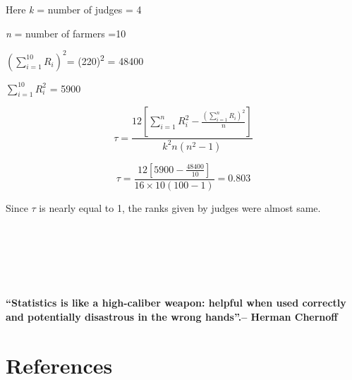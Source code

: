 \documentclass[
]{book}
\begin{document}
Here \emph{k} = number of judges = 4

\emph{n} = number of farmers =10

\(\left( \sum_{i = 1}^{10}R_{i} \right)^{2}\)= (220)\textsuperscript{2} = 48400

\(\sum_{i = 1}^{10}R_{i}^{2}\) = 5900

\[\tau = \frac{12\left\lbrack \sum_{i = 1}^{n}{R_{i}^{2} - \frac{\left( \sum_{i = 1}^{n}R_{i} \right)^{2}}{n}} \right\rbrack}{k^{2}n\left( n^{2} - 1 \right)}\]

\[\tau = \frac{12\left\lbrack 5900 - \frac{48400}{10} \right\rbrack}{16 \times 10\left( 100 - 1 \right)} = 0.803\]

Since \(\tau\) is nearly equal to 1, the ranks given by judges were almost
same.

~\\
\strut ~\\
\strut ~

\label{hello}
\textbf{``Statistics is like a high-caliber weapon: helpful when used
correctly and potentially disastrous in the wrong hands''.-- Herman
Chernoff}

\chapter*{References}\label{references}

  
\end{document}

